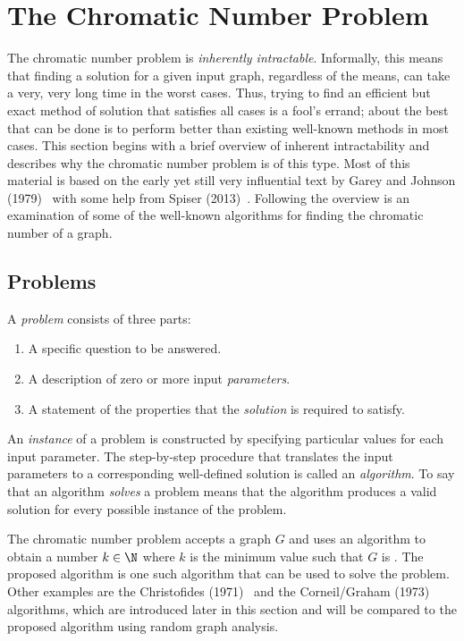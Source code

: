 \section{The Chromatic Number Problem}\label{sec:chromatic}

The chromatic number problem is \emph{inherently intractable}.  Informally, this means that finding a solution for
a given input graph, regardless of the means, can take a very, very long time in the worst cases.  Thus, trying to
find an efficient but exact method of solution that satisfies all cases is a fool's errand; about the best that can
be done is to perform better than existing well-known methods in most cases.  This section begins with a brief
overview of inherent intractability and describes why the chromatic number problem is of this type.  Most of this
material is based on the early yet still very influential text by Garey and Johnson (1979)~\cite{garey} with some
help from Spiser (2013)~\cite{sipser}.  Following the overview is an examination of some of the well-known
algorithms for finding the chromatic number of a graph.

\subsection{Problems}\label{sec:sub:problems}

A \emph{problem} consists of three parts:

\begin{enumerate}
\item A specific question to be answered.
\item A description of zero or more input \emph{parameters}.
\item A statement of the properties that the \emph{solution} is required to satisfy.
\end{enumerate}

An \emph{instance} of a problem is constructed by specifying particular values for each input parameter.  The
step-by-step procedure that translates the input parameters to a corresponding well-defined solution is called an
\emph{algorithm}.  To say that an algorithm \emph{solves} a problem means that the algorithm produces a valid
solution for every possible instance of the problem.

The chromatic number problem accepts a graph \(G\) and uses an algorithm to obtain a number \(k\in\N\) where \(k\)
is the minimum value such that \(G\) is .  The proposed algorithm is one such algorithm that can be
used to solve the problem.  Other examples are the Christofides (1971)~\cite{christofides} and the Corneil/Graham
(1973)~\cite{corneil} algorithms, which are introduced later in this section and will be compared to the proposed
algorithm using random graph analysis.

